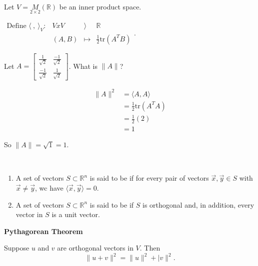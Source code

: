 \documentclass[11pt,fleqn]{book} %
\begin{document}
\begin{example}
{~~~}

    Let $V = \underset{2\times2}{M}(\mathbb{R})$ be an inner product space.

    $\begin{matrix} \text{Define } \langle ~,~ \rangle_V: &V x V &\rangle &\mathbb{R} \\ &(A, B) &\mapsto &\frac{1}{2}\mathrm{tr}(A^TB) \end{matrix}$.

    Let $A = \begin{bmatrix} \frac{1}{\sqrt{2}} &\frac{-1}{\sqrt{2}} \\ \frac{-1}{\sqrt{2}} &\frac{1}{\sqrt{2}} \end{bmatrix}$. What is $\|A\|$?

    \begin{align*}
        \|A\|^2
        &= \langle A, A \rangle
        \\
        &= \frac{1}{2}\mathrm{tr}(A^TA)
        \\
        &= \frac{1}{2}(2)
        \\
        &= 1
    \end{align*}

    So $\|A\| = \sqrt{1} = 1$.
\end{example}

\setcounter{chapter}{4}
\setcounter{definitionT}{8}
\begin{definition}
$\text{ }$

    \begin{enumerate}[label=\alph*)]
        \item A set of vectors $S \subset \mathbb{R}^n$ is said to be  if for every pair of vectors $\vec{x}, \vec{y} \in S$ with $\vec{x} \neq \vec{y}$, wc have $\langle \vec{x}, \vec{y} \rangle = 0$.
        \item A set of vectors $S \subset \mathbb{R}^n$ is said to be  if $S$ is orthogonal and, in addition, every vector in $S$ is a unit vector.
    \end{enumerate}
\end{definition}
\setcounter{chapter}{3}

\textbf{Pythagorean Theorem}

Suppose $u$ and $v$ are orthogonal vectors in $V$. Then $$\|u + v\|^2 = \|u\|^2 + |v\|^2. $$
\end{document}
